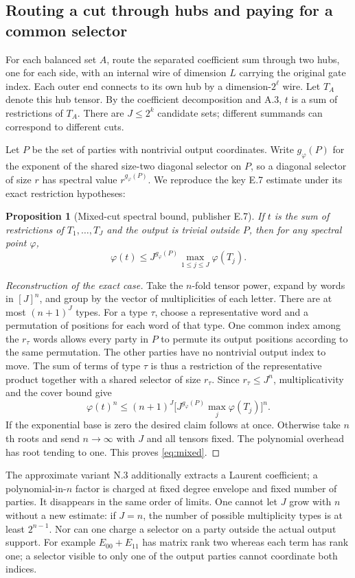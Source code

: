 \documentclass[11pt,letterpaper]{article}
\newtheorem{proposition}[theorem]{Proposition}
\theoremstyle{definition}\newtheorem{definition}[theorem]{Definition}\newtheorem{example}[theorem]{Example}
\theoremstyle{remark}\newtheorem{remark}[theorem]{Remark}
\begin{document}
\subsection{Routing a cut through hubs and paying for a common selector}\label{sec:selector}
For each balanced set $A$, route the separated coefficient sum through two hubs, one for each side, with an internal wire of dimension $L$ carrying the original gate index. Each outer end connects to its own hub by a dimension-$2^\ell$ wire. Let $T_A$ denote this hub tensor. By the coefficient decomposition and A.3, $t$ is a sum of restrictions of $T_A$. There are $J\le2^k$ candidate sets; different summands can correspond to different cuts.

Let $P$ be the set of parties with nontrivial output coordinates. Write $g_\varphi(P)$ for the exponent of the shared size-two diagonal selector on $P$, so a diagonal selector of size $r$ has spectral value $r^{g_\varphi(P)}$. We reproduce the key E.7 estimate under its exact restriction hypotheses:
\begin{proposition}[Mixed-cut spectral bound, publisher E.7]\label{prop:mixed}
If $t$ is the sum of restrictions of $T_1,\ldots,T_J$ and the output is trivial outside $P$, then for any spectral point $\varphi$,
\begin{equation}\label{eq:mixed}
 \varphi(t)\le J^{g_\varphi(P)}\max_{1\le j\le J}\varphi(T_j).
\end{equation}
\end{proposition}
\begin{proof}[Reconstruction of the exact case]
Take the $n$-fold tensor power, expand by words in $[J]^n$, and group by the vector of multiplicities of each letter. There are at most $(n+1)^J$ types. For a type $\tau$, choose a representative word and a permutation of positions for each word of that type. One common index among the $r_\tau$ words allows every party in $P$ to permute its output positions according to the same permutation. The other parties have no nontrivial output index to move. The sum of terms of type $\tau$ is thus a restriction of the representative product together with a shared selector of size $r_\tau$. Since $r_\tau\le J^n$, multiplicativity and the cover bound give
\[
 \varphi(t)^n\le(n+1)^J\bigl[J^{g_\varphi(P)}\max_j\varphi(T_j)\bigr]^n.
\]
If the exponential base is zero the desired claim follows at once. Otherwise take $n$th roots and send $n\to\infty$ with $J$ and all tensors fixed. The polynomial overhead has root tending to one. This proves \eqref{eq:mixed}.
\end{proof}
The approximate variant N.3 additionally extracts a Laurent coefficient; a polynomial-in-$n$ factor is charged at fixed degree envelope and fixed number of parties. It disappears in the same order of limits. One cannot let $J$ grow with $n$ without a new estimate: if $J=n$, the number of possible multiplicity types is at least $2^{n-1}$. Nor can one charge a selector on a party outside the actual output support. For example $E_{00}+E_{11}$ has matrix rank two whereas each term has rank one; a selector visible to only one of the output parties cannot coordinate both indices.
\end{document}
